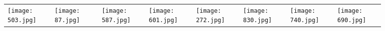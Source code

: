 \documentclass[10pt,twocolumn,letterpaper]{article}
\begin{document}
\begin{figure*}[!tp]
\begin{center}
\begin{tabular}{p{0.12\linewidth} p{0.12\linewidth} p{0.12\linewidth} p{0.12\linewidth}p{0.12\linewidth} p{0.12\linewidth} p{0.12\linewidth} p{0.12\linewidth}}
    \texttt{[image: 503.jpg]} &
    \texttt{[image: 87.jpg]} &
    \texttt{[image: 587.jpg]} &
    \texttt{[image: 601.jpg]} &
    \texttt{[image: 272.jpg]} &
    \texttt{[image: 830.jpg]} &
    \texttt{[image: 740.jpg]} &
    \texttt{[image: 690.jpg]}\\
    

\end{tabular}
\end{center}
\end{figure*}
\end{document}
